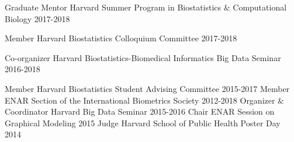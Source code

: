 

\begin{cvinvolves}

  \cvinvolve
    {Graduate Mentor} %
    {Harvard Summer Program in Biostatistics \& Computational Biology} %
    {} %
    {2017-2018} %

  \cvinvolve
    {Member} %
    {Harvard Biostatistics Colloquium Committee} %
    {} %
    {2017-2018} %

  \cvinvolve
    {Co-organizer} %
    {Harvard Biostatistics-Biomedical Informatics Big Data Seminar} %
    {} %
    {2016-2018} %
    
  \cvinvolve
    {Member} %
    {Harvard Biostatistics Student Advising Committee} %
    {} %
    {2015-2017} %
  \cvinvolve
    {Member} %
    {ENAR Section of the International Biometrics Society} %
    {} %
    {2012-2018} %
  \cvinvolve
    {Organizer \& Coordinator} %
    {Harvard Big Data Seminar} %
    {} %
    {2015-2016} %
  \cvinvolve
    {Chair} %
    {ENAR Session on Graphical Modeling} %
    {} %
    {2015} %
  \cvinvolve
    {Judge} %
    {Harvard School of Public Health Poster Day} %
    {} %
    {2014} %

\end{cvinvolves}
